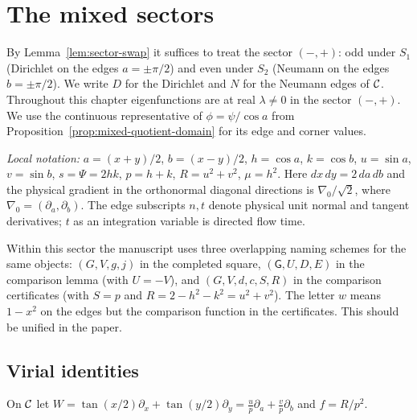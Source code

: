 \chapter{The mixed sectors}
\label{chap:mixed}

By Lemma~\ref{lem:sector-swap} it suffices to treat the sector $(-,+)$: odd
under $S_1$ (Dirichlet on the edges $a=\pm\pi/2$) and even under $S_2$ (Neumann
on the edges $b=\pm\pi/2$). We write $D$ for the Dirichlet and $N$ for the
Neumann edges of $\mathcal{C}$. Throughout this chapter eigenfunctions are at
real $\lambda\ne0$ in the sector $(-,+)$. We use the continuous representative
of $\phi=\psi/\cos a$ from Proposition~\ref{prop:mixed-quotient-domain}
for its edge and corner values.

\emph{Local notation:} $a=(x+y)/2$, $b=(x-y)/2$, $h=\cos a$, $k=\cos b$,
$u=\sin a$, $v=\sin b$, $s=\Psi=2hk$, $p=h+k$, $R=u^2+v^2$, $\mu=h^2$.
Here $dx\,dy=2\,da\,db$ and the physical gradient in the orthonormal
diagonal directions is $\nabla_0/\sqrt2$, where $\nabla_0=(\partial_a,\partial_b)$.
The edge subscripts $n,t$ denote physical unit normal and tangent
derivatives; $t$ as an integration variable is directed flow time.

\begin{remark}
Within this sector the manuscript uses three overlapping naming schemes for
the same objects: $(G,V,g,j)$ in the completed square, $(\mathsf G,U,D,E)$ in
the comparison lemma (with $U=-V$), and $(G,V,d,c,S,R)$ in the comparison
certificates (with $S=p$ and $R=2-h^2-k^2=u^2+v^2$). The letter $w$ means
$1-x^2$ on the edges but the comparison function in the certificates. This
should be unified in the paper.
\end{remark}

\section{Virial identities}

\begin{definition}
\label{def:mixed-field}
\leanok
On $\mathcal{C}$ let
$W=\tan(x/2)\partial_x+\tan(y/2)\partial_y=\frac{u}{p}\partial_a+\frac{v}{p}\partial_b$
and $f=R/p^2$.
\end{definition}

